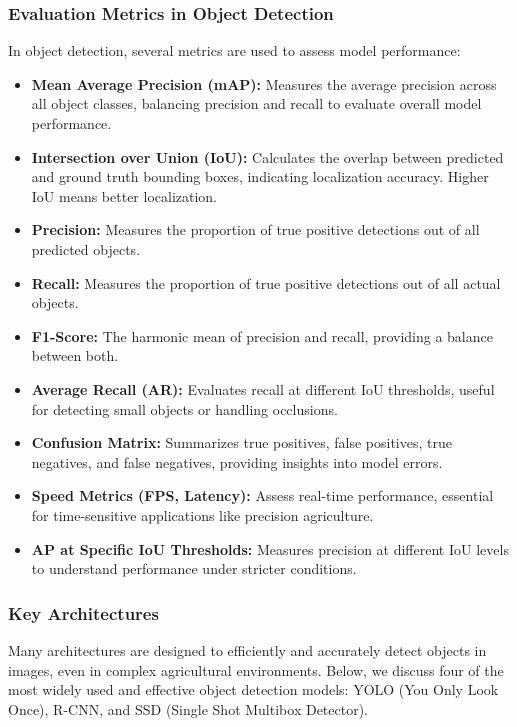 \subsubsection{Evaluation Metrics in Object Detection}    
In object detection, several metrics are used to assess model performance:
\begin{itemize}
    \item \textbf{Mean Average Precision (mAP):} Measures the average precision across all object classes, balancing precision and recall to evaluate overall model performance.
    \item \textbf{Intersection over Union (IoU):} Calculates the overlap between predicted and ground truth bounding boxes, indicating localization accuracy. Higher IoU means better localization.
    
    \item \textbf{Precision:} Measures the proportion of true positive detections out of all predicted objects.
    \item \textbf{Recall:} Measures the proportion of true positive detections out of all actual objects.
   
    \item \textbf{F1-Score:} The harmonic mean of precision and recall, providing a balance between both.
    \item \textbf{Average Recall (AR):} Evaluates recall at different IoU thresholds, useful for detecting small objects or handling occlusions.
    \item \textbf{Confusion Matrix:} Summarizes true positives, false positives, true negatives, and false negatives, providing insights into model errors.
    \item \textbf{Speed Metrics (FPS, Latency):} Assess real-time performance, essential for time-sensitive applications like precision agriculture.
    \item \textbf{AP at Specific IoU Thresholds:} Measures precision at different IoU levels to understand performance under stricter conditions.
\end{itemize}

\subsubsection{Key Architectures}
Many architectures are designed to efficiently and accurately detect objects in images, even in complex agricultural environments. Below, we discuss four of the most widely used and effective object detection models: YOLO (You Only Look Once), R-CNN, and SSD (Single Shot Multibox Detector). 

